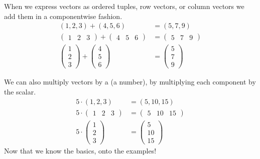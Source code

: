 \documentclass{ximera}
\begin{document}
When we express vectors as ordered tuples, row vectors, or column
vectors we add them in a componentwise fashion.
\begin{align*}
  (1,2,3) + (4,5,6) &= (5,7,9)\\
  \begin{pmatrix} 1 & 2 & 3   \end{pmatrix} + \begin{pmatrix} 4 & 5 & 6   \end{pmatrix} &= \begin{pmatrix} 5 & 7 & 9   \end{pmatrix}\\
  \begin{pmatrix} 1\\ 2\\ 3   \end{pmatrix} + \begin{pmatrix} 4\\ 5\\ 6   \end{pmatrix} &= \begin{pmatrix} 5\\ 7\\ 9   \end{pmatrix}
\end{align*}

We can also multiply vectors by a  (a number), by
multiplying each component by the scalar.
\begin{align*}
  5\cdot   (1,2,3) &= (5,10,15)\\
  5\cdot \begin{pmatrix} 1 & 2 & 3   \end{pmatrix}  &= \begin{pmatrix} 5 & 10 & 15   \end{pmatrix}\\
  5\cdot  \begin{pmatrix} 1\\ 2\\ 3   \end{pmatrix} &= \begin{pmatrix} 5\\ 10\\ 15   \end{pmatrix}
\end{align*}
Now that we know the basics, onto the examples!
\end{document}
